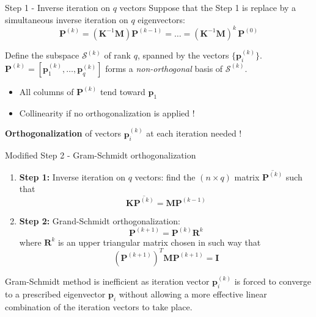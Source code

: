 \documentclass[aspectratio=169]{beamer}
\begin{document}
\begin{frame}{Step 1 - Inverse iteration on \( q \) vectors}
  Suppose that the Step 1 is replace by a simultaneous inverse iteration on \( q \) eigenvectors:
  \[
    \mathbf P^{(k)} = (\mathbf K^{-1}\mathbf M)\mathbf P^{(k-1)}=\dots = (\mathbf K^{-1}\mathbf M)^k\, \mathbf P^{(0)}
  \]
  \vspace{-0.5cm}
  \begin{block}{}
    Define the subspace \( \mathcal S^{(k)} \) of rank \( q \), spanned by the vectors \( \{\mathbf p_i^{(k)}\} \).  $\mathbf  P^{(k)}=[\mathbf p^{(k)}_1,\dots,\mathbf p^{(k)}_q]$ forms a \emph{non-orthogonal} basis of \( \mathcal S^{(k)} \).
  \end{block}
  \begin{itemize}
    \item[\XSolidBrush] All columns of \(\mathbf  P^{(k)} \) tend toward \( \mathbf  p_1 \)
    \item[\XSolidBrush]  Collinearity if no orthogonalization is applied !
  \end{itemize}

  \begin{tcolorbox}[colback=darkred!10,colframe=darkred!40!black]
    \begin{center}
      \textbf{Orthogonalization} of vectors \(\mathbf p_i^{(k)} \) at each iteration needed !
    \end{center}
  \end{tcolorbox}
\end{frame}

\begin{frame}{Modified Step 2 - Gram-Schmidt orthogonalization}
  \begin{enumerate}
    \item \textbf{Step 1:} Inverse iteration on \( q \) vectors: find the $(n\times q)$ matrix $\overline{\mathbf P^{(k)}}$ such that
          \[
            \mathbf K\overline{\mathbf P^{(k)}} = \mathbf M\mathbf P^{(k-1)}
          \]
    \item \textbf{Step 2:} Grand-Schmidt orthogonalization:
          $$\mathbf P^{(k+1)}=\mathbf P^{(k)}\mathbf R^{k}$$
          where $\mathbf R^{k}$ is an upper triangular matrix chosen in such way that
          $$(\mathbf P^{(k+1)})^T\mathbf M \mathbf P^{(k+1)} = \mathbf I$$
  \end{enumerate}
  \begin{block}{}
    Gram-Schmidt method is inefficient as iteration vector $\mathbf p_i^{(k)}$ is forced to converge to a prescribed eigenvector $\mathbf p_i$ without allowing a more effective linear combination of the iteration vectors to take place.
  \end{block}
\end{frame}
\end{document}
